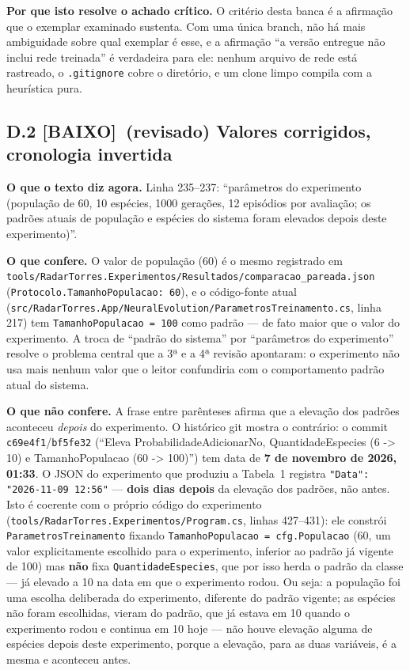 \documentclass[11pt,a4paper]{article}
\newcommand{\baixo}{\textbf{\color{gray}[BAIXO]}}
\begin{document}
\textbf{Por que isto resolve o achado crítico.} O critério desta banca é a afirmação que o exemplar
examinado sustenta. Com uma única branch, não há mais ambiguidade sobre qual exemplar é esse, e a
afirmação ``a versão entregue não inclui rede treinada'' é verdadeira para ele: nenhum arquivo de rede
está rastreado, o \texttt{.gitignore} cobre o diretório, e um clone limpo compila com a heurística pura.

\subsection*{D.2 \baixo\ (revisado) Valores corrigidos, cronologia invertida}

\textbf{O que o texto diz agora.} Linha 235--237: ``parâmetros do experimento (população de 60, 10
espécies, 1000 gerações, 12 episódios por avaliação; os padrões atuais de população e espécies do
sistema foram elevados depois deste experimento)''.

\textbf{O que confere.} O valor de população (60) é o mesmo registrado em
\texttt{tools/RadarTorres.Experimentos/Resultados/comparacao\_pareada.json}
(\texttt{Protocolo.TamanhoPopulacao: 60}), e o código-fonte atual
(\texttt{src/RadarTorres.App/NeuralEvolution/ParametrosTreinamento.cs}, linha 217) tem
\texttt{TamanhoPopulacao = 100} como padrão --- de fato maior que o valor do experimento. A troca de
``padrão do sistema'' por ``parâmetros do experimento'' resolve o problema central que a 3ª e a 4ª
revisão apontaram: o experimento não usa mais nenhum valor que o leitor confundiria com o
comportamento padrão atual do sistema.

\textbf{O que não confere.} A frase entre parênteses afirma que a elevação dos padrões aconteceu
\textit{depois} do experimento. O histórico git mostra o contrário: o commit
\texttt{c69e4f1}/\texttt{bf5fe32} (``Eleva ProbabilidadeAdicionarNo, QuantidadeEspecies (6 -> 10) e
TamanhoPopulacao (60 -> 100)'') tem data de \textbf{7 de novembro de 2026, 01:33}. O JSON do
experimento que produziu a Tabela~1 registra \texttt{"Data": "2026-11-09 12:56"} --- \textbf{dois dias
depois} da elevação dos padrões, não antes. Isto é coerente com o próprio código do experimento
(\texttt{tools/RadarTorres.Experimentos/Program.cs}, linhas 427--431): ele constrói
\texttt{ParametrosTreinamento} fixando \texttt{TamanhoPopulacao = cfg.Populacao} (60, um valor
explicitamente escolhido para o experimento, inferior ao padrão já vigente de 100) mas \textbf{não}
fixa \texttt{QuantidadeEspecies}, que por isso herda o padrão da classe --- já elevado a 10 na data em
que o experimento rodou. Ou seja: a população foi uma escolha deliberada do experimento, diferente do
padrão vigente; as espécies não foram escolhidas, vieram do padrão, que já estava em 10 quando o
experimento rodou e continua em 10 hoje --- não houve elevação alguma de espécies depois deste
experimento, porque a elevação, para as duas variáveis, é a mesma e aconteceu antes.
\end{document}
